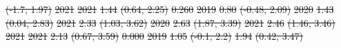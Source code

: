 \documentclass[
  letterpaper,
  DIV=11,
  numbers=noendperiod]{scrartcl}
\providecommand{\DIFdeltex}[1]{{\protect\color{red}\sout{#1}}}                      %
\providecommand{\DIFdelFL}[1]{\DIFdel{#1}} %
\providecommand{\DIFdel}[1]{\texorpdfstring{\DIFdeltex{#1}}{}} %
\begin{document}
\DIFdelFL{(-1.7, 1.97) }%
\DIFdelFL{\hspace{1em}2021 }%
\DIFdelFL{2021 }%
\DIFdelFL{1.44 }%
\DIFdelFL{(0.64, 2.25) }%
\DIFdelFL{0.260 }%
\DIFdelFL{2019 }%
\DIFdelFL{0.80 }%
\DIFdelFL{(-0.48, 2.09) }%
\DIFdelFL{2020 }%
\DIFdelFL{1.43 }%
\DIFdelFL{(0.04, 2.83) }%
\DIFdelFL{2021 }%
\DIFdelFL{2.33 }%
\DIFdelFL{(1.03, 3.62) }%
\DIFdelFL{2020 }%
\DIFdelFL{2.63 }%
\DIFdelFL{(1.87, 3.39) }%
\DIFdelFL{2021 }%
\DIFdelFL{2.46 }%
\DIFdelFL{(1.46, 3.46) }%
\DIFdelFL{\hspace{1em}2021 }%
\DIFdelFL{2021 }%
\DIFdelFL{2.13 }%
\DIFdelFL{(0.67, 3.59) }%
\DIFdelFL{0.000 }%
\DIFdelFL{2019 }%
\DIFdelFL{1.05 }%
\DIFdelFL{(-0.1, 2.2) }%
\DIFdelFL{1.94 }%
\DIFdelFL{(0.42, 3.47) }%
\end{document}
